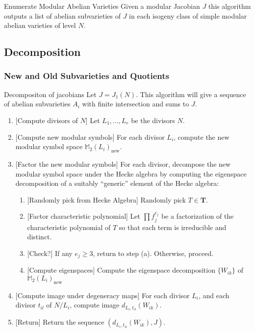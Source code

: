 \documentclass{article}
\begin{document}
\begin{algorithm}{Enumerate Modular Abelian Varieties}
  Given a modular Jacobian $J$ this algorithm outputs a list of
  abelian subvarieties of $J$ in each isogeny class of simple modular
  abelian varieties of level $N$.
\end{algorithm}


\subsection{Decomposition}
\subsubsection{New and Old Subvarieties and Quotients}


\begin{algorithm}{Decompositon of jacobians}
    Let $J=J_1(N)$. This algorithm will give a sequence of abelian subvarieties
    $A_i$ with finite intersection and sums to $J$.
\begin{enumerate}
    \item{} [Compute divisors of $N$]
        Let $L_1,\ldots, L_r$ be the divisors $N$.
    \item{} [Compute new modular symbols]
        For each divisor $L_i$, compute the new modular symbol space
        $\mathbb{M}_2(L_i)_\mathrm{new}$.
    \item{} [Factor the new modular symbols]
        For each divisor, decompose the new modular symbol space under the
        Hecke algebra by computing the eigenspace decomposition of a suitably
        ``generic'' element of the Hecke algebra:
        \begin{enumerate}
            \item{} [Randomly pick from Hecke Algebra]
                Randomly pick $T\in \mathbf{T}$.
            \item{} [Factor characteristic polynomial]
                Let $\prod f_j ^{e_j}$ be a factorization of the characteristic
                polynomial of $T$ so that each term is irreducible and
                distinct.
            \item{} [Check?]
                If any $e_j \geq 3$, return to step (a). Otherwise, proceed.
            \item{} [Compute eigenspaces]
                Compute the eigenspace decomposition $\{W_{ik}\}$ of
                $\mathbb{M}_2(L_i)_\mathrm{new}$
        \end{enumerate}
    \item{} [Compute image under degeneracy maps]
        For each divisor $L_i$, and each divisor $t_{il}$ of $N/L_i$, compute
        image $d_{L_i, t_{il}}(W_{ik})$.
    \item{} [Return]
        Return the sequence $(d_{L_i, t_{il}}(W_{ik}), J)$.
\end{enumerate}

    
\end{algorithm}
\end{document}
